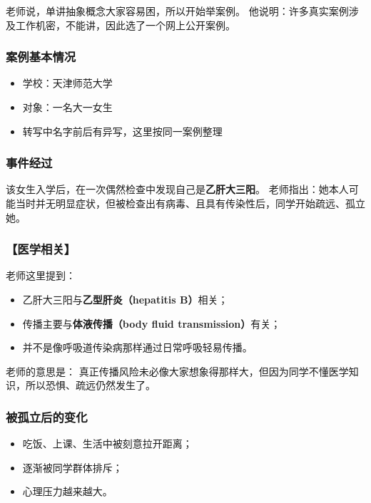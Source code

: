 \documentclass[
  chinese,
  9pt,
  a4paper,
]{ctexart}
\providecommand{\tightlist}{%
  \setlength{\itemsep}{0pt}\setlength{\parskip}{0pt}}
\begin{document}
老师说，单讲抽象概念大家容易困，所以开始举案例。
他说明：许多真实案例涉及工作机密，不能讲，因此选了一个网上公开案例。

\subsubsection{案例基本情况}\label{ux6848ux4f8bux57faux672cux60c5ux51b5}

\begin{itemize}
\tightlist
\item
  学校：天津师范大学
\item
  对象：一名大一女生
\item
  转写中名字前后有异写，这里按同一案例整理
\end{itemize}

\subsubsection{事件经过}\label{ux4e8bux4ef6ux7ecfux8fc7}

该女生入学后，在一次偶然检查中发现自己是\textbf{乙肝大三阳}。
老师指出：她本人可能当时并无明显症状，但被检查出有病毒、且具有传染性后，同学开始疏远、孤立她。

\subsubsection{【医学相关】}\label{ux533bux5b66ux76f8ux5173}

老师这里提到：

\begin{itemize}
\tightlist
\item
  乙肝大三阳与\textbf{乙型肝炎（hepatitis B）}相关；
\item
  传播主要与\textbf{体液传播（body fluid transmission）}有关；
\item
  并不是像呼吸道传染病那样通过日常呼吸轻易传播。
\end{itemize}

老师的意思是：
真正传播风险未必像大家想象得那样大，但因为同学不懂医学知识，所以恐惧、疏远仍然发生了。

\subsubsection{被孤立后的变化}\label{ux88abux5b64ux7acbux540eux7684ux53d8ux5316}

\begin{itemize}
\tightlist
\item
  吃饭、上课、生活中被刻意拉开距离；
\item
  逐渐被同学群体排斥；
\item
  心理压力越来越大。
\end{itemize}
\end{document}
